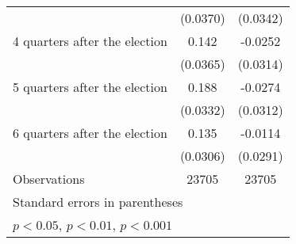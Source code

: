 \begin{table}[htbp]
\begin{tabular}{l*{2}{c}}
                    &    (0.0370)         &    (0.0342)         \\
[1em]
 4 quarters after the election&       0.142\sym{***}&     -0.0252         \\
                    &    (0.0365)         &    (0.0314)         \\
[1em]
 5 quarters after the election&       0.188\sym{***}&     -0.0274         \\
                    &    (0.0332)         &    (0.0312)         \\
[1em]
 6 quarters after the election&       0.135\sym{***}&     -0.0114         \\
                    &    (0.0306)         &    (0.0291)         \\
\hline
Observations        &       23705         &       23705         \\
\hline\hline
\multicolumn{3}{l}{\footnotesize Standard errors in parentheses}\\
\multicolumn{3}{l}{\footnotesize \sym{*} \(p<0.05\), \sym{**} \(p<0.01\), \sym{***} \(p<0.001\)}\\
\end{tabular}
\end{table}

